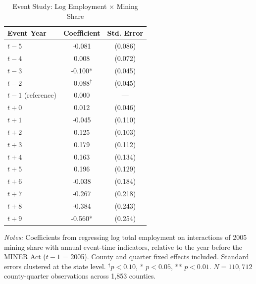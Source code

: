 \begin{table}[htbp]
\centering
\caption{Event Study: Log Employment $\times$ Mining Share}
\label{tab:event_study}
\begin{threeparttable}
\begin{tabular}{lcc}
\toprule
Event Year & Coefficient & Std. Error \\
\midrule
$t-5$ & -0.081 & (0.086) \\
$t-4$ & \phantom{-}0.008 & (0.072) \\
$t-3$ & -0.100* & (0.045) \\
$t-2$ & -0.088$^{\dagger}$ & (0.045) \\
\midrule
$t-1$ (reference) & 0.000 & --- \\
\midrule
$t+0$ & \phantom{-}0.012 & (0.046) \\
$t+1$ & -0.045 & (0.110) \\
$t+2$ & \phantom{-}0.125 & (0.103) \\
$t+3$ & \phantom{-}0.179 & (0.112) \\
$t+4$ & \phantom{-}0.163 & (0.134) \\
$t+5$ & \phantom{-}0.196 & (0.129) \\
$t+6$ & -0.038 & (0.184) \\
$t+7$ & -0.267 & (0.218) \\
$t+8$ & -0.384 & (0.243) \\
$t+9$ & -0.560* & (0.254) \\
\bottomrule
\end{tabular}
\begin{tablenotes}[flushleft]
\small
\item \textit{Notes:} Coefficients from regressing log total employment on interactions of 2005 mining share with annual event-time indicators, relative to the year before the MINER Act ($t-1$ = 2005). County and quarter fixed effects included. Standard errors clustered at the state level. $^{\dagger} p<0.10$, * $p<0.05$, ** $p<0.01$. $N = 110{,}712$ county-quarter observations across 1,853 counties.
\end{tablenotes}
\end{threeparttable}
\end{table}

